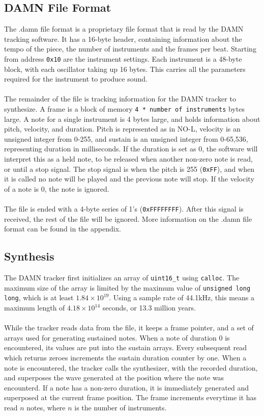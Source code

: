 \documentclass[11pt]{article}
\begin{document}
\subsection{DAMN File Format}
The .damn file format is a proprietary file format that is read by the DAMN tracking software. It has a 16-byte header, containing information about the tempo of the piece, the number of instruments and the frames per beat. Starting from address \texttt{0x10} are the instrument settings. Each instrument is a 48-byte block, with each oscillator taking up 16 bytes. This carries all the parameters required for the instrument to produce sound.\\\\
The remainder of the file is tracking information for the DAMN tracker to synthesize. A frame is a block of memory \texttt{4 * number of instruments} bytes large. A note for a single instrument is 4 bytes large, and holds information about pitch, velocity, and duration. Pitch is represented as in NO-L, velocity is an unsigned integer from 0-255, and sustain is an unsigned integer from 0-65,536, representing duration in milliseconds. If the duration is set as 0, the software will interpret this as a held note, to be released when another non-zero note is read, or until a stop signal. The stop signal is when the pitch is 255 (\texttt{0xFF}), and when it is called no note will be played and the previous note will stop. If the velocity of a note is 0, the note is ignored.\\\\
The file is ended with a 4-byte series of 1's (\texttt{0xFFFFFFFF}). After this signal is received, the rest of the file will be ignored. More information on the .damn file format can be found in the appendix.

\subsection{Synthesis}
The DAMN tracker first initializes an array of \texttt{uint16\_t} using \texttt{calloc}. The maximum size of the array is limited by the maximum value of \texttt{unsigned long long}, which is at least \(1.84\times 10^{19}\). Using a sample rate of 44.1kHz, this means a maximum length of \(4.18\times 10^{14}\) seconds, or 13.3 million years.
\\\\
While the tracker reads data from the file, it keeps a frame pointer, and a set of arrays used for generating sustained notes. When a note of duration 0 is encountered, its values are put into the sustain arrays. Every subsequent read which returns zeroes increments the sustain duration counter by one. When a note is encountered, the tracker calls the synthesizer, with the recorded duration, and superposes the wave generated at the position where the note was encounterd. If a note has a non-zero duration, it is immediately generated and superposed at the current frame position. The frame increments everytime it has read \(n\) notes, where \(n\) is the number of instruments.
\end{document}
